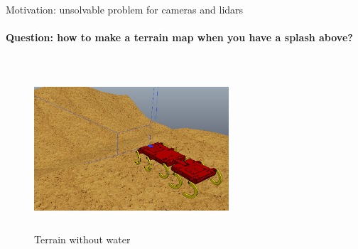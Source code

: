 \documentclass[aspectratio=169,xcolor=table]{beamer}
\begin{document}
\begin{frame}[t]{Motivation: unsolvable problem for cameras and lidars}
    \framesubtitle{Question: how to make a terrain map when you have a splash above?}
    \vspace{-1cm}
    \begin{columns}[T,onlytextwidth]
        \begin{column}{0.55\textwidth}


            \begin{figure}[H]
                \centering\includegraphics[height=6cm,width=1\textwidth,keepaspectratio]{terrain_wo_water.png}
                \caption*{Terrain without water}
            \end{figure}
        \end{column}
        \begin{column}{0.44\textwidth}
            \begin{figure}[H]
                \begin{subfigure}[b]{0.9\textwidth}
                    \centering
\end{subfigure}
\end{figure}
\end{column}
\end{columns}
\end{frame}
\end{document}
